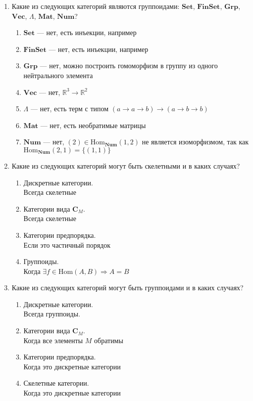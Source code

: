 \documentclass[draft]{article}
\newcommand{\cat}[1]{\mathbf{#1}}
\renewcommand{\C}{\cat{C}}
\newcommand{\Set}{\cat{Set}}
\newcommand{\FinSet}{\cat{FinSet}}
\newcommand{\Grp}{\cat{Grp}}
\renewcommand{\Vec}{\cat{Vec}}
\newcommand{\Mat}{\cat{Mat}}
\newcommand{\Num}{\cat{Num}}
\newcommand{\fs}[1]{\mathrm{#1}}
\newcommand{\Hom}{\fs{Hom}}
\begin{document}
\begin{enumerate}
\item Какие из следующих категорий являются группоидами: $\Set$, $\FinSet$, $\Grp$, $\Vec$, $\Lambda$, $\Mat$, $\Num$?

\begin{enumerate}
\item $\Set$ --- нет, есть инъекции, например
\item $\FinSet$ --- нет, есть инъекции, например
\item $\Grp$ --- нет, можно построить гомоморфизм в группу из одного нейтрального элемента
\item $\Vec$ --- нет, $\mathbb{R}^3 \to \mathbb{R}^2$
\item $\Lambda$ --- нет, есть терм с типом $(a\to a\to b)\to (a\to b\to b)$
\item $\Mat$ --- нет, есть необратимые матрицы
\item $\Num$ --- нет, $(2) \in \Hom_\Num(1, 2)$ не является изоморфизмом, так как $\Hom_\Num(2, 1) = \lbrace (1, 1) \rbrace$
\end{enumerate}


\item Какие из следующих категорий могут быть скелетными и в каких случаях?
\begin{enumerate}
\item Дискретные категории.\\
		Всегда скелетные
\item Категории вида $\C_M$.\\
		Всегда скелетные
\item Категории предпорядка.\\
		Если это частичный порядок
\item Группоиды.\\
		Когда $\exists f \in \Hom(A, B) \Rightarrow A = B$
\end{enumerate}


\item Какие из следующих категорий могут быть группоидами и в каких случаях?
\begin{enumerate}
\item Дискретные категории.\\
		Всегда группоиды.
\item Категории вида $\C_M$.\\
		Когда все элементы $M$ обратимы
\item Категории предпорядка.\\
		Когда это дискретные категории
\item Скелетные категории.\\
		Когда это дискретные категории
\end{enumerate}


\end{enumerate}
\end{document}
